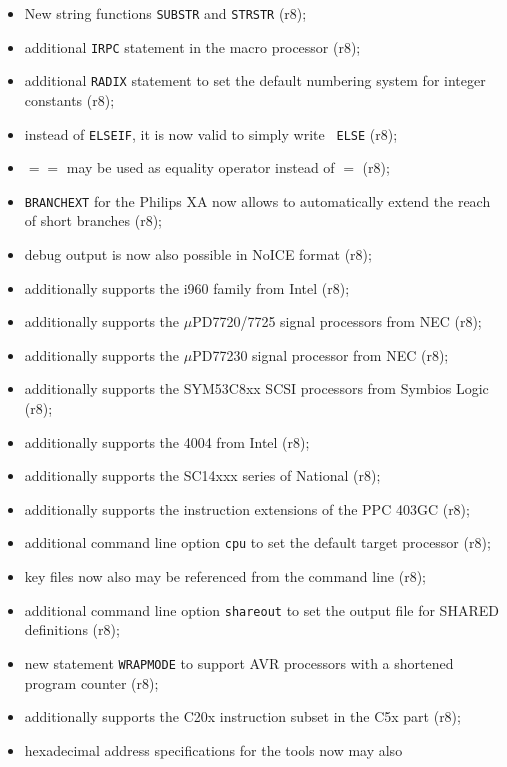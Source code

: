 \documentclass[12pt,twoside]{report}
\newcommand{\tty}[1]{{\tt #1}}
\begin{document}
\begin{itemize}
{\begin{itemize}
{            (r8);}
      \item{New string functions \tty{SUBSTR} and \tty{STRSTR} (r8);}
      \item{additional \tty{IRPC} statement in the macro processor (r8);}
      \item{additional \tty{RADIX} statement to set the default numbering
            system for integer constants (r8);}
      \item{instead of {\tt ELSEIF}, it is now valid to simply write {\tt
            ELSE} (r8);}
      \item{$==$ may be used as equality operator instead of $=$ (r8);}
      \item{\tty{BRANCHEXT} for the Philips XA now allows to automatically
            extend the reach of short branches (r8);}
      \item{debug output is now also possible in NoICE format (r8);}
      \item{additionally supports the i960 family from Intel (r8);}
      \item{additionally supports the $\mu$PD7720/7725 signal processors
            from NEC (r8);}
      \item{additionally supports the $\mu$PD77230 signal processor from
            NEC (r8);}
      \item{additionally supports the SYM53C8xx SCSI processors from
            Symbios Logic (r8);}
      \item{additionally supports the 4004 from Intel (r8);}
      \item{additionally supports the SC14xxx series of National (r8);}
      \item{additionally supports the instruction extensions of the PPC
            403GC (r8);}
      \item{additional command line option {\tt cpu} to set the default
            target processor (r8);}
      \item{key files now also may be referenced from the command line
            (r8);}
      \item{additional command line option {\tt shareout} to set the
            output file for SHARED definitions (r8);}
      \item{new statement {\tt WRAPMODE} to support AVR processors with
            a shortened program counter (r8);}
      \item{additionally supports the C20x instruction subset in the C5x
            part (r8);}
      \item{hexadecimal address specifications for the tools now may also
}
\end{itemize}}
\end{itemize}
\end{document}
